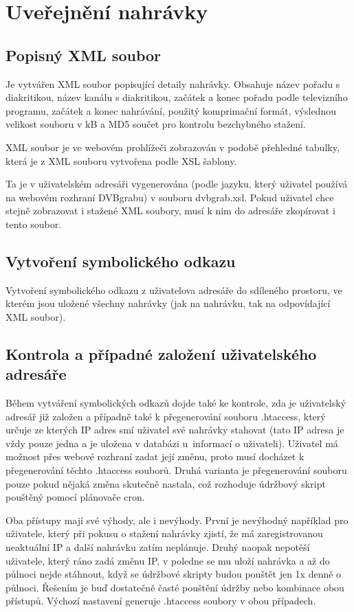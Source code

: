 \section{Uveřejnění nahrávky}
\subsection{Popisný XML soubor}
Je vytvářen XML soubor popisující detaily nahrávky. Obsahuje název pořadu s diakritikou, název kanálu s diakritikou, začátek a konec pořadu podle televizního programu, začátek a konec nahrávání, použitý komprimační formát, výslednou velikost souboru v kB a MD5 součet pro kontrolu bezchybného stažení.

XML soubor je ve webovém prohlížeči zobrazován v podobě přehledné tabulky, která je z XML souboru vytvořena podle XSL šablony.

Ta je v uživatelském adresáři vygenerována (podle jazyku, který uživatel používá na webovém rozhraní DVBgrabu) v souboru dvbgrab.xsl. Pokud uživatel chce stejně zobrazovat i stažené XML soubory, musí k nim do adresáře zkopírovat i tento soubor.

\subsection{Vytvoření symbolického odkazu}
Vytvoření symbolického odkazu z uživatelova adresáře do sdíleného prostoru, ve kterém jsou uložené všechny nahrávky (jak na nahrávku, tak na odpovídající XML soubor).

\subsection{Kontrola a případné založení uživatelského adresáře}
Během vytváření symbolických odkazů dojde také ke kontrole, zda je uživatelský adresář již založen a případně také k přegenerování souboru .htaccess, který určuje ze kterých IP adres smí uživatel své nahrávky stahovat (tato IP adresa je vždy pouze jedna a je uložena v databázi u~informací o uživateli). Uživatel má možnost přes webové rozhraní zadat její změnu, proto musí docházet k přegenerování těchto .htaccess souborů. Druhá varianta je přegenerování souboru pouze pokud nějaká změna skutečně nastala, což rozhoduje údržbový skript pouštěný pomocí plánovače cron. 

Oba přístupy mají své výhody, ale i nevýhody. První je nevýhodný například pro uživatele, který při pokusu o stažení nahrávky zjistí, že má zaregistrovanou neaktuální IP a další nahrávku zatím neplánuje. Druhý naopak nepotěší uživatele, který ráno zadá změnu IP, v poledne se mu uloží nahrávka a až do půlnoci nejde stáhnout, když se údržbové skripty budou pouštět jen 1x denně o půlnoci. Řešením je buď dostatečně časté pouštění údržby nebo kombinace obou přístupů. Výchozí nastavení generuje .htaccess soubory v obou případech.

